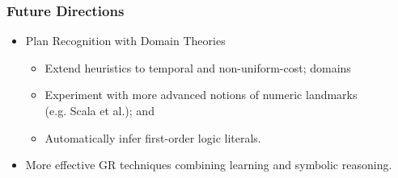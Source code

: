 \documentclass[usenames,dvipsnames]{beamer}
\begin{document}
\begin{frame}[c]\frametitle{Future Directions}
	\begin{itemize}
		\item Plan Recognition with Domain Theories
        \begin{itemize}
			\item Extend heuristics to temporal and non-uniform-cost; domains
            \item Experiment with more advanced notions of numeric landmarks \\(e.g. Scala et al.); and
            \item Automatically infer first-order logic literals.
        \end{itemize}
		\item More effective GR techniques combining learning and symbolic reasoning.
	\end{itemize}
\end{frame}
\end{document}
